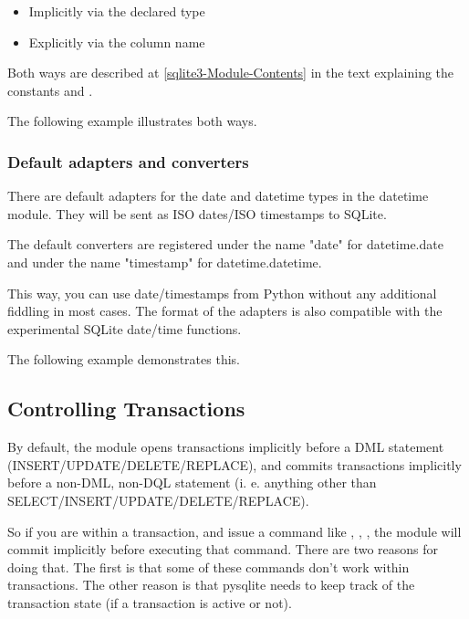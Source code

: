 \begin{itemize}
 \item Implicitly via the declared type
 \item Explicitly via the column name
\end{itemize}

Both ways are described at \ref{sqlite3-Module-Contents} in the text explaining
the constants  and .


The following example illustrates both ways.

    

\subsubsection{Default adapters and converters}

There are default adapters for the date and datetime types in the datetime
module. They will be sent as ISO dates/ISO timestamps to SQLite.

The default converters are registered under the name "date" for datetime.date
and under the name "timestamp" for datetime.datetime.

This way, you can use date/timestamps from Python without any additional
fiddling in most cases. The format of the adapters is also compatible with the
experimental SQLite date/time functions.

The following example demonstrates this.

    

\subsection{Controlling Transactions \label{sqlite3-Controlling-Transactions}}

By default, the  module opens transactions implicitly before a DML
statement (INSERT/UPDATE/DELETE/REPLACE), and commits transactions implicitly
before a non-DML, non-DQL statement (i. e. anything other than
SELECT/INSERT/UPDATE/DELETE/REPLACE).

So if you are within a transaction, and issue a command like , , , the  module will commit implicitly
before executing that command. There are two reasons for doing that. The first
is that some of these commands don't work within transactions. The other reason
is that pysqlite needs to keep track of the transaction state (if a transaction
is active or not).

